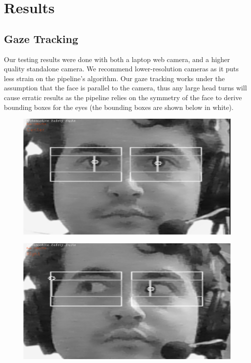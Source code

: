 \section{Results}

\subsection{Gaze Tracking}
Our testing results were done with both a laptop web camera, and a higher quality standalone camera. We recommend lower-resolution cameras as it puts less strain on the pipeline's algorithm. Our gaze tracking works under the assumption that the face is parallel to the camera, thus any large head turns will cause erratic results as the pipeline relies on the symmetry of the face to derive bounding boxes for the eyes (the bounding boxes are shown below in white). 

\begin{figure}[H]
    \centering
    \begin{minipage}{.45\textwidth}
      \centering
      \includegraphics[width=\linewidth]{figures/EyeTrackingStraight.png}
      \label{fig:eyeCtr}
    \end{minipage}%
    \hspace{15pt}
    \begin{minipage}{.45\textwidth}
      \centering
      \includegraphics[width=\linewidth]{figures/EyeTrackingRight.png}
      \label{fig:eyeRigt}
    \end{minipage}
\end{figure}

